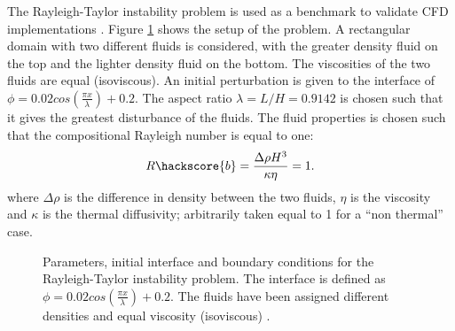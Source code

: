 The Rayleigh-Taylor instability problem is used as a benchmark to validate CFD implementations \cite{VANKEKEN1997}. Figure \ref{RT2DSETUP} shows the setup of the problem. A rectangular domain with two different fluids is considered, with the greater density fluid on the top and the lighter density fluid on the bottom. The viscosities of the two fluids are equal (isoviscous). An initial perturbation is given to the interface of $\phi=0.02cos(\frac{\pi x}{\lambda}) + 0.2$. The aspect ratio $\lambda = L/H = 0.9142$ is chosen such that it gives the greatest disturbance of the fluids. The fluid properties is chosen such that the compositional Rayleigh number is equal to one:
%
\begin{equation}
R\hackscore{b} = \frac{\Delta \rho H^{3}}{\kappa \eta} = 1.
\label{RAYLEIGH NUMBER}
\end{equation}
%
where $\Delta \rho$ is the difference in density between the two fluids, $\eta$ is the viscosity and $\kappa$ is the thermal diffusivity; arbitrarily taken equal to 1 for a ``non thermal'' case.
%
%
\begin{figure}
\center
{}
\caption{Parameters, initial interface and boundary conditions for the Rayleigh-Taylor instability problem. The interface is defined as $\phi=0.02cos(\frac{\pi x}{\lambda}) + 0.2$. The fluids have been assigned different densities and equal viscosity (isoviscous) \cite{BOURGOUIN2006}.}
\label{RT2DSETUP}
\end{figure}
